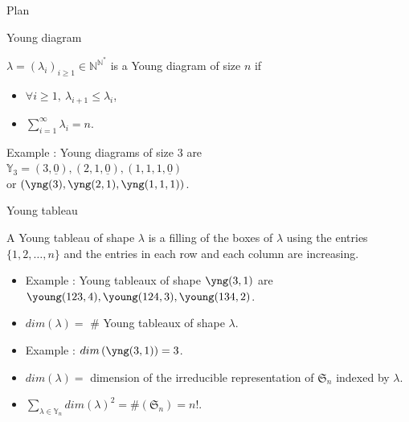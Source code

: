 \documentclass[english]{beamer}
\begin{document}
\begin{frame}{Plan}
\tableofcontents[currentsection,currentsubsection,
    hideothersubsections, 
    sectionstyle=show/shaded,
]
\end{frame}
\begin{frame}{Young diagram}
   \begin{definition}
   $\lambda=(\lambda_i)_{i\geq1} \in \mathbb{N}^{\mathbb{N}^*}$ is a Young diagram of size $n$ if 
   \begin{itemize}
       \item $\forall i\geq1, \  \lambda_{i+1}\leq \lambda_i$,
       \item $\sum_{i=1}^\infty \lambda_i=n$.
   \end{itemize}
   \end{definition}
   \vspace{10 mm}

   Example :  Young diagrams of size 3 are   \\ $\mathbb{Y}_3=(3,\underline{0}),(2,1,\underline{0}),(1,1,1,\underline{0})$
   \\   or $\left(\yng(3),\yng(2,1),\yng(1,1,1)\right)$.
   
 
\end{frame}


\begin{frame}{Young tableau}
    \begin{definition}
    A Young tableau of shape $\lambda$ is a filling of the boxes of $\lambda$ using the entries $\{1,2,\dots,n\}$ and the entries in each row and each column are increasing.
    \end{definition}
    \begin{itemize}
        \item     Example : Young tableaux of shape $\yng(3,1)$ are $\young(123,4),\young(124,3),\young(134,2)$. 
    \item$dim(\lambda)=$ \# Young tableaux of shape $\lambda$. 
    \item Example : $dim\left(\yng(3,1)\right)=3$.
    \item $dim(\lambda) = $   dimension of the irreducible representation of  $\mathfrak{S}_n$ indexed by $\lambda$.
     \item $\sum_{\lambda \in \mathbb{Y}_n} dim(\lambda)^2=\#(\mathfrak{S}_n)=n!$.
    \end{itemize}
 \end{frame}
\end{document}
